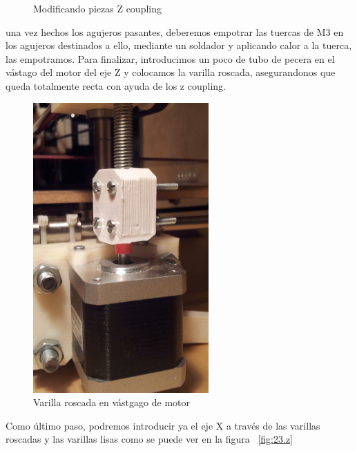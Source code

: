 \begin{figure}[H]
\begin{subfigure}[htb]{0.5\textwidth}
		                \label{fig:120.z}
		        \end{subfigure}
		        \caption{Modificando piezas Z coupling}\label{fig:21.z}
		\end{figure}
		una vez hechos los agujeros pasantes, deberemos empotrar las tuercas de M3 en los agujeros destinados a ello, mediante un soldador y aplicando calor a la tuerca, las empotramos.
		Para finalizar, introducimos un poco de tubo de pecera en el vástago del motor del eje Z y colocamos la varilla roscada, asegurandonos que queda totalmente recta con ayuda de los z coupling.
		\begin{figure}[!htp]
			\centering
	\includegraphics[width=0.6\textwidth]{../../Fotos/93.jpg}
			\caption{Varilla roscada en vástgago de motor}
			\label{fig:24.z}
		\end{figure}
		Como último paso, podremos introducir ya el eje X a través de las varillas roscadas y las varillas lisas como se puede ver en la figura ~\ref{fig:23.z}\\
		
